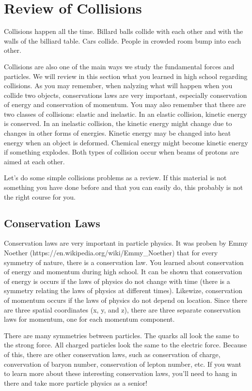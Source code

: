 \section{Review of Collisions}

Collisions happen all the time.  Billard balls collide with each other and with the walls of the billiard table.  Cars collide.  People in crowded room bump into each other.

Collisions are also one of the main ways we study the fundamental forces and particles.  We will review in this section what you learned in high school regarding collisions.  As you may remember, when nalyzing what will happen when you collide two objects, conservations laws are very important, especially conservation of energy and conservation of momentum.  You may also remember that there are two classes of collisions: elastic and inelastic.  In an elastic collision, kinetic energy is conserved.  In an inelastic collision, the kinetic energy might change due to changes in other forms of energies.  Kinetic energy may be changed into heat energy when an object is deformed.  Chemical energy might become kinetic energy if something explodes. Both types of collision occur when beams of protons are aimed at each other.

Let's do some simple collisions problems as a review.  If this material is not something you have done before and that you can easily do, this probably is not the right course for you.

\subsection{Conservation Laws}
Conservation laws are very important in particle physics.  It was proben by Emmy Noether (https://en.wikipedia.org/wiki/Emmy\_Noether) that for every symmetry of nature, there is a conservation law.  You learned about conservation of energy and momentum during high school.  It can be shown that conservation of energy is occurs if the laws of physics do not change with time (there is a symmetry relating the laws of physics at different times).  Likewize, conservation of momentum occurs if the laws of physics do not depend on location.  Since there are three spatial coordinates (x, y, and z), there are three separate conservation laws for momentum, one for each momentum component.

There are many symmetries between particles.  The quarks all look the same to the strong force.  All charged particles look the same to the electric force.  Because of this, there are other conservation laws, such as conservation of charge, convervation of baryon number, conservation of lepton number, etc.  If you want to learn more about these interesting conservation laws, you'll need to hang in there and take more particle physics as a senior! 

